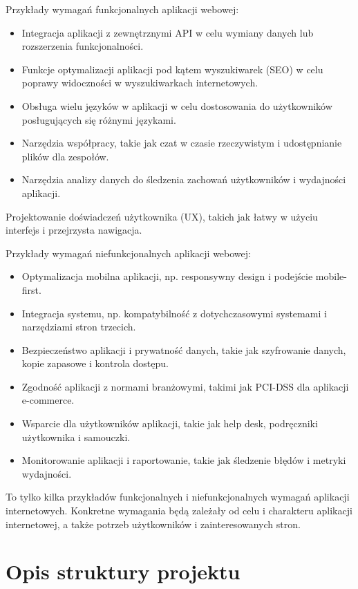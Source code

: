 \noindent Przykłady wymagań funkcjonalnych aplikacji webowej:
\begin{itemize}
    \item Integracja aplikacji z zewnętrznymi API w celu wymiany danych lub rozszerzenia funkcjonalności.
    \item Funkcje optymalizacji aplikacji pod kątem wyszukiwarek (SEO) w celu poprawy widoczności w wyszukiwarkach internetowych.
    \item Obsługa wielu języków w aplikacji w celu dostosowania do użytkowników posługujących się różnymi językami.
    \item Narzędzia współpracy, takie jak czat w czasie rzeczywistym i udostępnianie plików dla zespołów.
    \item Narzędzia analizy danych do śledzenia zachowań użytkowników i wydajności aplikacji.
\end{itemize}
Projektowanie doświadczeń użytkownika (UX), takich jak łatwy w użyciu interfejs i przejrzysta nawigacja.

\noindent Przykłady wymagań niefunkcjonalnych aplikacji webowej:
\begin{itemize}
    \item Optymalizacja mobilna aplikacji, np. responsywny design i podejście mobile-first.
    \item Integracja systemu, np. kompatybilność z dotychczasowymi systemami i narzędziami stron trzecich.
    \item Bezpieczeństwo aplikacji i prywatność danych, takie jak szyfrowanie danych, kopie zapasowe i kontrola dostępu.
    \item Zgodność aplikacji z normami branżowymi, takimi jak PCI-DSS dla aplikacji e-commerce.
    \item Wsparcie dla użytkowników aplikacji, takie jak help desk, podręczniki użytkownika i samouczki.
    \item Monitorowanie aplikacji i raportowanie, takie jak śledzenie błędów i metryki wydajności.
\end{itemize}

To tylko kilka przykładów funkcjonalnych i niefunkcjonalnych wymagań aplikacji internetowych. Konkretne wymagania będą zależały od celu i charakteru aplikacji internetowej, a także potrzeb użytkowników i zainteresowanych stron.

\section{Opis struktury projektu}

